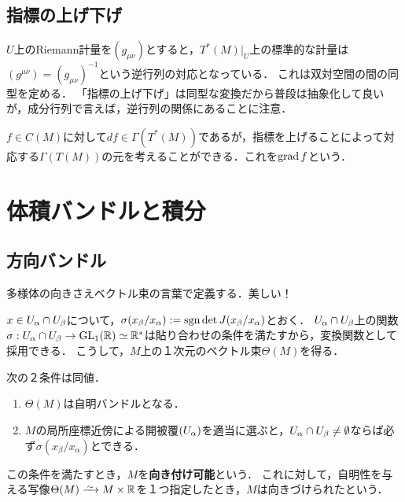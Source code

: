 \documentclass[uplatex,dvipdfmx]{jsreport}
\begin{document}
\subsection{指標の上げ下げ}

$U$上のRiemann計量を$(g_{\mu\nu})$とすると，$T^*(M)|_U$上の標準的な計量は$(g^{\mu\nu})=(g_{\mu\nu})^{-1}$という逆行列の対応となっている．
これは双対空間の間の同型を定める．
「指標の上げ下げ」は同型な変換だから普段は抽象化して良いが，成分行列で言えば，逆行列の関係にあることに注意．

$f\in C(M)$に対して$df\in\Gamma(T^*(M))$であるが，指標を上げることによって対応する$\Gamma(T(M))$の元を考えることができる．これを$\operatorname{\mathrm{grad}} f$という．

\section{体積バンドルと積分}

\subsection{方向バンドル}

\begin{tcolorbox}[colframe=ForestGreen, colback=ForestGreen!10!white,breakable,colbacktitle=ForestGreen!40!white,coltitle=black,fonttitle=\bfseries\sffamily,
title=]
    多様体の向きさえベクトル束の言葉で定義する．美しい！
\end{tcolorbox}

\begin{notation}[方向バンドル]
    $x\in U_\alpha\cap U_\beta$について，$\sigma(x_\beta/x_\alpha):=\mathrm{sgn}\det J(x_\beta/x_\alpha)$とおく．
    $U_\alpha\cap U_\beta$上の関数$\sigma:U_\alpha\cap U_\beta\to\mathrm{GL}_1(\mathbb{R})\simeq\mathbb{R}^*$は貼り合わせの条件を満たすから，変換関数として採用できる．
    こうして，$M$上の１次元のベクトル束$\Theta(M)$を得る．
\end{notation}

\begin{theorem}[orientation]
    次の２条件は同値．
    \begin{enumerate}
        \item $\Theta(M)$は自明バンドルとなる．
        \item $M$の局所座標近傍による開被覆$(U_\alpha)$を適当に選ぶと，$U_\alpha\cap U_\beta\ne\emptyset$ならば必ず$\sigma(x_\beta/x_\alpha)$とできる．
    \end{enumerate}
    この条件を満たすとき，$M$を\textbf{向き付け可能}という．
    これに対して，自明性を与える写像$\Theta(M)\iso M\times\R$を１つ指定したとき，$M$は向きづけられたという．
\end{theorem}
\end{document}
